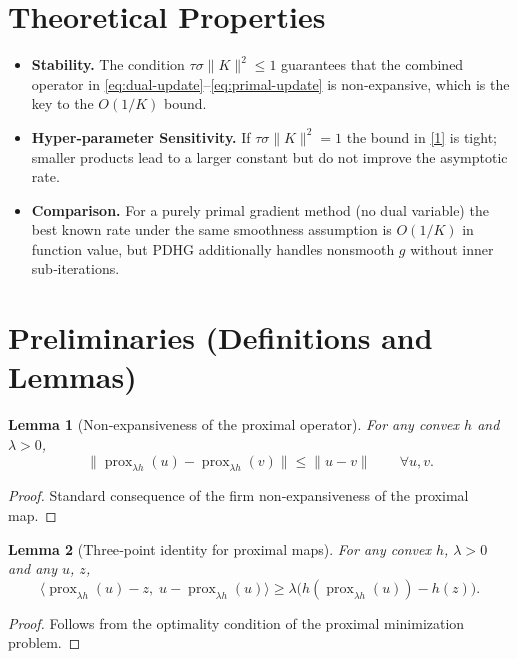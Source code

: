 \documentclass{article}
\newtheorem{lemma}{Lemma}[section]
\begin{document}
\section*{Theoretical Properties}
\begin{itemize}
\item \textbf{Stability.} The condition $\tau\sigma\|K\|^{2}\le1$ guarantees that the combined operator in \eqref{eq:dual-update}–\eqref{eq:primal-update} is non‑expansive, which is the key to the $O(1/K)$ bound.
\item \textbf{Hyper‑parameter Sensitivity.} If $\tau\sigma\|K\|^{2}=1$ the bound in \eqref{1} is tight; smaller products lead to a larger constant but do not improve the asymptotic rate.
\item \textbf{Comparison.} For a purely primal gradient method (no dual variable) the best known rate under the same smoothness assumption is $O(1/K)$ in function value, but PDHG additionally handles nonsmooth $g$ without inner sub‑iterations.
\end{itemize}

\section*{Preliminaries (Definitions and Lemmas)}
\begin{lemma}[Non‑expansiveness of the proximal operator]\label{lem:prox-nonexp}
For any convex $h$ and $\lambda>0$,
\[
\|\operatorname{prox}_{\lambda h}(u)-\operatorname{prox}_{\lambda h}(v)\|
\le \|u-v\|\qquad\forall u,v.
\]
\end{lemma}
\begin{proof}
Standard consequence of the firm non‑expansiveness of the proximal map. \qedhere
\end{proof}

\begin{lemma}[Three‑point identity for proximal maps]\label{lem:three-point}
For any convex $h$, $\lambda>0$ and any $u$, $z$,
\[
\langle \operatorname{prox}_{\lambda h}(u)-z,\; u-\operatorname{prox}_{\lambda h}(u)\rangle
\ge \lambda\bigl(h(\operatorname{prox}_{\lambda h}(u))-h(z)\bigr).
\]
\end{lemma}
\begin{proof}
Follows from the optimality condition of the proximal minimization problem. \qedhere
\end{proof}

\end{document}
